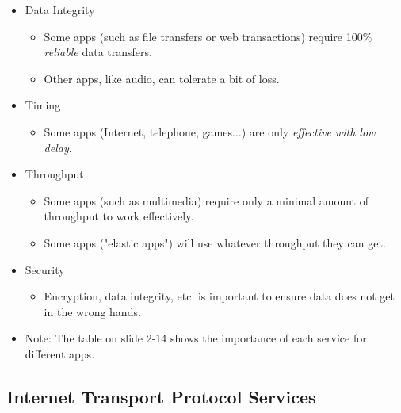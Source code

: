 \documentclass{article}
\begin{document}
\begin{itemize}
\item Data Integrity
\begin{itemize}
\item Some apps (such as file transfers or web transactions) require 100\% {\it reliable} data transfers.
\item Other apps, like audio, can tolerate a bit of loss.
\end{itemize}
\item Timing
\begin{itemize}
\item Some apps (Internet, telephone, games...) are only {\it effective with low delay}.
\end{itemize}
\item Throughput
\begin{itemize}
\item Some apps (such as multimedia) require only a minimal amount of throughput to work effectively.
\item Some apps ("elastic apps") will use whatever throughput they can get.
\end{itemize}
\item Security
\begin{itemize}
\item Encryption, data integrity, etc. is important to ensure data does not get in the wrong hands.
\end{itemize}
\item Note: The table on slide 2-14 shows the importance of each service for different apps.
\end{itemize}

\subsection{Internet Transport Protocol Services}
\end{document}

